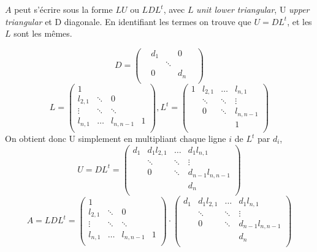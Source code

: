 \documentclass{article}
\begin{document}
\(A\) peut s'écrire sous la forme \(LU\) ou \(LDL^t\), avec \(L\) \textit{unit lower triangular}, U \textit{upper triangular} et D diagonale.
En identifiant les termes on trouve que \(U = DL^t\), et les \(L\) sont les mêmes.

\[
	D = 
	\begin{pmatrix}
	&d_1	& 		& 0&	\\
	&		& \ddots& &		\\
	& 0	& 		& d_n & 	\\
	\end{pmatrix}
\]
\[	
	L = 
	\begin{pmatrix}
	1		& 	& 	&  	\\
	l_{2,1}	& \ddots&0& 	\\
	\vdots	& \ddots & \ddots&  \\
	l_{n,1}	& \dots  & l_{n,n-1} & 1 	\\
	\end{pmatrix}, 
	L^t = 
	\begin{pmatrix}
	1		& l_{2,1}& \dots	& l_{n,1} 	\\
			& \ddots&\ddots& \vdots	\\
			& 0 & \ddots& l_{n,n-1} \\
			&  && 1 	\\
	\end{pmatrix}
\]
On obtient donc U simplement en multipliant chaque ligne \(i\) de \(L^t\) par \(d_i\),
\[
	U = DL^t = 
	\begin{pmatrix}
	d_1		& d_1 l_{2,1}& \dots	& d_1 l_{n,1} 	\\
			& \ddots&\ddots& \vdots	\\
			& 0 & \ddots& d_{n-1} l_{n,n-1} \\
			&  && d_n 	\\
	\end{pmatrix}
\]
\[	
	A = LDL^t = 
	\begin{pmatrix}
	1		& 	& 	&  	\\
	l_{2,1}	& \ddots&0& 	\\
	\vdots	& \ddots & \ddots&  \\
	l_{n,1}	& \dots  & l_{n,n-1} & 1 	\\
	\end{pmatrix}\cdot
	\begin{pmatrix}
	d_1		& d_1 l_{2,1}& \dots	& d_1 l_{n,1} 	\\
			& \ddots&\ddots& \vdots	\\
			& 0 & \ddots& d_{n-1} l_{n,n-1} \\
			&  && d_n 	\\
	\end{pmatrix}
\]
\end{document}

